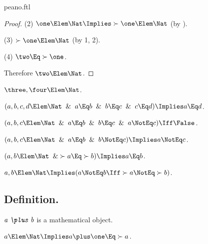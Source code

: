 \documentclass{stex}
\begin{document}
\begin{smodule}{peano.ftl}
\begin{forthel}
\begin{proof}
    (2) $\one \Elem \Nat \Implies \succ{\one} \Elem \Nat$ (by ).

    (3) $\succ{\one} \Elem \Nat$ (by 1, 2).

    (4) $\two \Eq \succ{\one}$.

    Therefore $\two \Elem \Nat$.
  \end{proof}

  \begin{theorem*}[title=12,name=P12]
    $\three,\four \Elem \Nat$.
  \end{theorem*}

  \begin{theorem*}[title=13,name=P13]
    $(a,b,c,d \Elem \Nat \And a \Eq b \And b \Eq c \And c \Eq d) \Implies a \Eq d$.
  \end{theorem*}

  \begin{theorem*}[title=14,name=P14]
    $(a,b,c \Elem \Nat \And a \Eq b \And b \Eq c \And a \NotEq c) \Iff \False$.
  \end{theorem*}

  \begin{theorem*}[title=15,name=P15]
    $(a,b,c \Elem \Nat \And a \Eq b \And b \NotEq c) \Implies a \NotEq c$.
  \end{theorem*}

  \begin{theorem*}[title=16,name=P16]
    $(a,b \Elem \Nat \And \succ{a} \Eq \succ{b}) \Implies a \Eq b$.
  \end{theorem*}

  \begin{theorem*}[title=17,name=P17]
    $a,b \Elem \Nat \Implies (a \NotEq b \Iff \succ{a} \NotEq \succ{b})$.
  \end{theorem*}
\end{forthel}


\subsection{Definition.}


\begin{forthel}
  \begin{signature*}
    $\emph{a \plus b}$ is a mathematical object.
  \end{signature*}

  \begin{axiom*}
    $a \Elem \Nat \Implies a \plus \one \Eq \succ{a}$.
  \end{axiom*}


\end{forthel}
\end{smodule}
\end{document}
